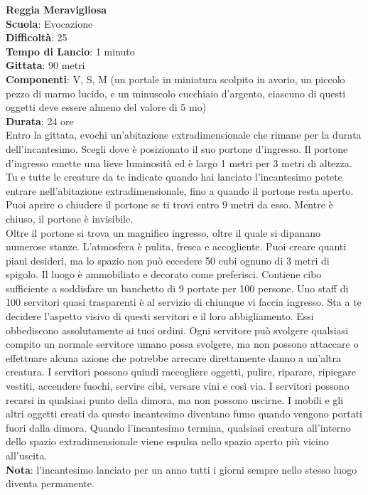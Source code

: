 \begin{multicols}{2}
\medskip\textbf{Reggia Meravigliosa}\\
\textbf{Scuola}: Evocazione\\
\textbf{Difficoltà}: 25\\
\textbf{Tempo di Lancio}: 1 minuto\\
\textbf{Gittata}: 90 metri\\
\textbf{Componenti}: V, S, M (un portale in miniatura scolpito in avorio, un piccolo pezzo di marmo lucido, e un minuscolo cucchiaio d'argento, ciascuno di questi oggetti deve essere almeno del valore di 5 mo)\\
\textbf{Durata}: 24 ore\\
Entro la gittata, evochi un'abitazione extradimensionale che rimane per la durata dell'incantesimo. Scegli dove è posizionato il suo portone d'ingresso. Il portone d'ingresso emette una lieve luminosità ed è largo 1 metri per 3 metri di altezza. Tu e tutte le creature da te indicate quando hai lanciato l'incantesimo potete entrare nell'abitazione extradimensionale, fino a quando il portone resta aperto. Puoi aprire o chiudere il portone se ti trovi entro 9 metri da esso. Mentre è chiuso, il portone è invisibile.\\
Oltre il portone si trova un magnifico ingresso, oltre il quale si dipanano numerose stanze. L'atmosfera è pulita, fresca e accogliente. Puoi creare quanti piani desideri, ma lo spazio non può eccedere 50 cubi ognuno di 3 metri di spigolo. Il luogo è ammobiliato e decorato come preferisci. Contiene cibo sufficiente a soddisfare un banchetto di 9 portate per 100 persone. Uno staff di 100 servitori quasi trasparenti è al servizio di chiunque vi faccia ingresso. Sta a te decidere l'aspetto visivo di questi servitori e il loro abbigliamento. Essi obbediscono assolutamente ai tuoi ordini. Ogni servitore può svolgere qualsiasi compito un normale servitore umano possa svolgere, ma non possono attaccare o effettuare alcuna azione che potrebbe arrecare direttamente danno a un'altra creatura. I servitori possono quindi raccogliere oggetti, pulire, riparare, ripiegare vestiti, accendere fuochi, servire cibi, versare vini e così via. I servitori possono recarsi in qualsiasi punto della dimora, ma non possono uscirne. I mobili e gli altri oggetti creati da questo incantesimo diventano fumo quando vengono portati fuori dalla dimora. Quando l'incantesimo termina, qualsiasi creatura all'interno dello spazio extradimensionale viene espulsa nello spazio aperto più vicino all'uscita.\\
\textbf{Nota}: l'incantesimo lanciato per un anno tutti i giorni sempre nello stesso luogo diventa permanente.


\end{multicols}
